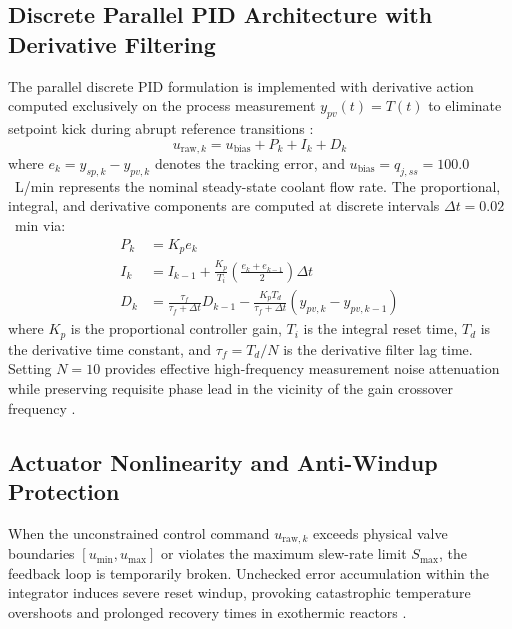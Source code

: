 
\subsection{Discrete Parallel PID Architecture with Derivative Filtering}
The parallel discrete PID formulation is implemented with derivative action computed exclusively on the process measurement $y_{pv}(t) = T(t)$ to eliminate setpoint kick during abrupt reference transitions \cite{astrom2006pid, seborg2010process}:
\begin{equation}
    u_{\text{raw}, k} = u_{\text{bias}} + P_k + I_k + D_k
    \label{eq:pid_parallel}
\end{equation}
where $e_k = y_{sp, k} - y_{pv, k}$ denotes the tracking error, and $u_{\text{bias}} = q_{j,ss} = 100.0$~L/min represents the nominal steady-state coolant flow rate. The proportional, integral, and derivative components are computed at discrete intervals $\Delta t = 0.02$~min via:
\begin{align}
    P_k &= K_p e_k \label{eq:proportional_term} \\
    I_k &= I_{k-1} + \frac{K_p}{T_i} \left(\frac{e_k + e_{k-1}}{2}\right) \Delta t \label{eq:integral_trapezoidal} \\
    D_k &= \frac{\tau_f}{\tau_f + \Delta t} D_{k-1} - \frac{K_p T_d}{\tau_f + \Delta t} (y_{pv, k} - y_{pv, k-1}) \label{eq:derivative_filtered}
\end{align}
where $K_p$ is the proportional controller gain, $T_i$ is the integral reset time, $T_d$ is the derivative time constant, and $\tau_f = T_d / N$ is the derivative filter lag time. Setting $N = 10$ provides effective high-frequency measurement noise attenuation while preserving requisite phase lead in the vicinity of the gain crossover frequency \cite{astrom1995pid, visioli2006practical}.

\subsection{Actuator Nonlinearity and Anti-Windup Protection}
When the unconstrained control command $u_{\text{raw}, k}$ exceeds physical valve boundaries $[u_{\min}, u_{\max}]$ or violates the maximum slew-rate limit $S_{\max}$, the feedback loop is temporarily broken. Unchecked error accumulation within the integrator induces severe reset windup, provoking catastrophic temperature overshoots and prolonged recovery times in exothermic reactors \cite{hippe2006windup, tarbouriech2009antiwindup}.


